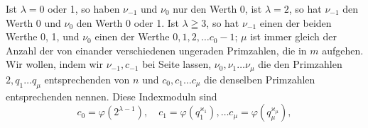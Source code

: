 
Ist $\lambda = 0$ oder 1, so haben $\nu_{-1}$ und $\nu_0$ nur den Werth 0,
ist $\lambda = 2$, so hat $\nu_{-1}$ den Werth 0 und $\nu_0$ den Werth 0 oder 1.
Ist $\lambda \geqq 3$, so hat $\nu_{-1}$ einen der beiden Werthe 0, 1, und $\nu_0$
einen der Werthe $0, 1, 2, \ldots c_0 - 1$; $\mu$ ist immer gleich der
Anzahl der von einander verschiedenen ungeraden Primzahlen,
die in $m$ aufgehen. Wir wollen, indem wir $\nu_{-1}, c_{-1}$ bei Seite
lassen, $\nu_0, \nu_1 \ldots \nu_\mu$ die den Primzahlen $2, q_1 \ldots q_\mu$ entsprechenden
 von $n$ und $c_0, c_1 \ldots c_\mu$ die denselben Primzahlen entsprechenden
 nennen. Diese Indexmoduln sind
\[
c_0 = \varphi(2^{\lambda-1}), \quad c_1 = \varphi(q_1^{\varkappa_1}), \ldots c_\mu = \varphi(q_\mu^{\varkappa_\mu}),
\]
